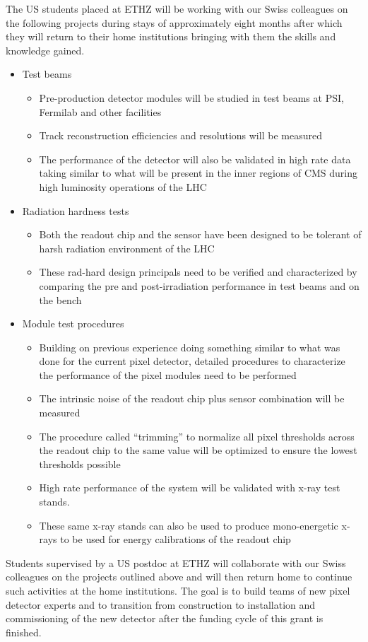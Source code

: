 The US students placed at ETHZ will be working with our Swiss
colleagues on the following projects during stays of approximately
eight months after which they will return to their home institutions
bringing with them the skills and knowledge gained.
\begin{itemize}
\item Test beams
  \begin{itemize}
  \item Pre-production detector modules will be studied in test beams
    at PSI, Fermilab and other facilities
  \item Track reconstruction efficiencies and resolutions will be
    measured
  \item The performance of the detector will also be validated in high
    rate data taking similar to what will be present in the inner
    regions of CMS during high luminosity operations of the LHC
  \end{itemize}
\item Radiation hardness tests
  \begin{itemize}
  \item Both the readout chip and the sensor have been designed to be
    tolerant of harsh radiation environment of the LHC
  \item These rad-hard design principals need to be verified and
    characterized by comparing the pre and post-irradiation
    performance in test beams and on the bench
  \end{itemize}
\item Module test procedures
  \begin{itemize}
  \item Building on previous experience doing something similar to
    what was done for the current pixel detector, detailed procedures
    to characterize the performance of the pixel modules need to be performed
  \item The intrinsic noise of the readout chip plus sensor
    combination will be measured
  \item The procedure called ``trimming'' to normalize all pixel
    thresholds across the readout chip to the same value will be
    optimized to ensure the lowest thresholds possible
  \item High rate performance of the system will be validated with
    x-ray test stands.
  \item These same x-ray stands can also be used to produce
    mono-energetic x-rays to be used for energy calibrations of the
    readout chip
  \end{itemize}
\end{itemize}

Students supervised by a US postdoc at ETHZ will collaborate with our
Swiss colleagues on the projects outlined above and will then return
home to continue such activities at the home institutions.  The goal
is to build teams of new pixel detector experts and to transition from
construction to installation and commissioning of the new detector
after the funding cycle of this grant is finished.